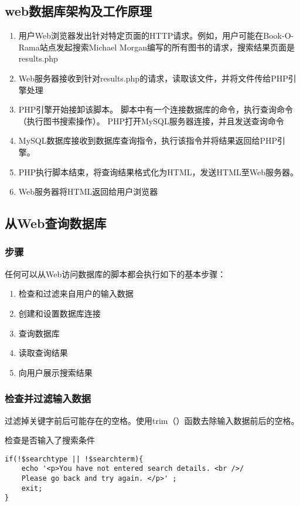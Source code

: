 \documentclass[11pt]{article}
\begin{document}
\subsection{web数据库架构及工作原理}
\label{sec:org471a08e}
\begin{enumerate}
\item 用户Web浏览器发出针对特定页面的HTTP请求。例如，用户可能在Book-O-Rama站点发起搜索Michael Morgan编写的所有图书的请求，搜索结果页面是results.php
\item Web服务器接收到针对results.php的请求，读取该文件，并将文件传给PHP引擎处理
\item PHP引擎开始接卸该脚本。 脚本中有一个连接数据库的命令，执行查询命令（执行图书搜索操作）。 PHP打开MySQL服务器连接，并且发送查询命令
\item MySQL数据库接收到数据库查询指令，执行该指令并将结果返回给PHP引擎。
\item PHP执行脚本结束，将查询结果格式化为HTML，发送HTML至Web服务器。
\item Web服务器将HTML返回给用户浏览器
\end{enumerate}
\subsection{从Web查询数据库}
\label{sec:orgcbf60fe}
\subsubsection{步骤}
\label{sec:org195fb94}
任何可以从Web访问数据库的脚本都会执行如下的基本步骤：
\begin{enumerate}
\item 检查和过滤来自用户的输入数据
\item 创建和设置数据库连接
\item 查询数据库
\item 读取查询结果
\item 向用户展示搜索结果
\end{enumerate}
\subsubsection{检查并过滤输入数据}
\label{sec:orgacfd28d}
过滤掉关键字前后可能存在的空格。使用trim（）函数去除输入数据前后的空格。

检查是否输入了搜索条件
\begin{verbatim}
if(!$searchtype || !$searchterm){
    echo '<p>You have not entered search details. <br />/
	Please go back and try again. </p>' ;
    exit;
}
\end{verbatim}
\end{document}
